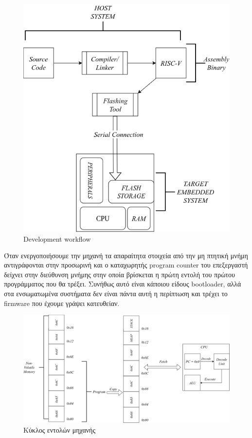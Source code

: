 \begin{figure}[h!]
\centering
\includegraphics[scale=0.4,angle = 90]{images/introduction/programming_embedded.png}
\caption{Development workflow}
 \label{fig:embedded_workflow}
\end{figure}

\newpage

Όταν ενεργοποιήσουμε την μηχανή τα απαραίτητα στοιχεία από την μη πτητική μνήμη
αντιγράφονται στην προσωρινή και ο καταχωρητής program counter του επεξεργαστή
δείχνει στην διεύθυνση μνήμης στην οποία βρίσκεται η πρώτη εντολή του πρώτου
προγράμματος που θα τρέξει. Συνήθως αυτό είναι κάποιου είδους bootloader, αλλά
στα ενσωματωμένα συστήματα δεν είναι πάντα αυτή η περίπτωση και τρέχει το firmware
που έχουμε γράψει κατευθείαν. 

\begin{figure}[h!]
\centering
\includegraphics[scale=0.4,angle=90]{images/introduction/instruction_cycle.drawio.png}
\caption{Κύκλος εντολών μηχανής}
 \label{fig:instruction_cycle_workflow}
\end{figure}

